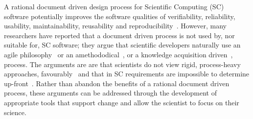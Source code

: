 \documentclass{sig-alternate-05-2015}
\begin{document}
A rational document driven design process for Scientific Computing (SC) software
potentially improves the software qualities of verifiability, reliability,
usability, maintainability, reusability and
reproducibility~\cite{SmithAndKoothoor2016}.  However, many researchers have
reported that a document driven process is not used by, nor suitable for, SC
software; they argue that scientific developers naturally use an agile
philosophy~\cite{AckroydEtAl2008, CarverEtAl2007, EasterbrookAndJohns2009,
  Segal2005} or an amethododical~\cite{Kelly2013}, or a knowledge acquisition
driven~\cite{Kelly2015}, process.  The arguments are are that scientists do not
view rigid, process-heavy approaches, favourably~\cite{CarverEtAl2007} and that
in SC requirements are impossible to determine up-front~\cite{CarverEtAl2007,
  SegalAndMorris2008}.  Rather than abandon the benefits of a rational document
driven process, these arguments can be addressed through the development of
appropriate tools that support change and allow the scientist to focus on their
science.


\end{document}
